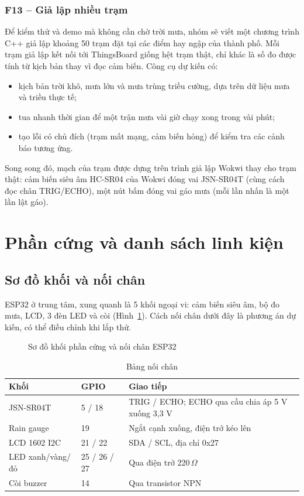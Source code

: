 \documentclass[12pt,a4paper]{article}
\begin{document}
\subsubsection{F13 -- Giả lập nhiều trạm}\label{sec:f13}
Để kiểm thử và demo mà không cần chờ trời mưa, nhóm sẽ viết một chương trình C++ giả lập khoảng 50 trạm đặt tại các điểm hay ngập của thành phố. Mỗi trạm giả lập kết nối tới ThingsBoard giống hệt trạm thật, chỉ khác là số đo được tính từ kịch bản thay vì đọc cảm biến. Công cụ dự kiến có:
\begin{itemize}
  \item kịch bản trời khô, mưa lớn và mưa trùng triều cường, dựa trên dữ liệu mưa và triều thực tế;
  \item tua nhanh thời gian để một trận mưa vài giờ chạy xong trong vài phút;
  \item tạo lỗi có chủ đích (trạm mất mạng, cảm biến hỏng) để kiểm tra các cảnh báo tương ứng.
\end{itemize}
Song song đó, mạch của trạm được dựng trên trình giả lập Wokwi thay cho trạm thật: cảm biến siêu âm HC-SR04 của Wokwi đóng vai JSN-SR04T (cùng cách đọc chân TRIG/ECHO), một nút bấm đóng vai gáo mưa (mỗi lần nhấn là một lần lật gáo).

\section{Phần cứng và danh sách linh kiện}

\subsection{Sơ đồ khối và nối chân}

ESP32 ở trung tâm, xung quanh là 5 khối ngoại vi: cảm biến siêu âm, bộ đo mưa, LCD, 3 đèn LED và còi (Hình~\ref{fig:wiring}). Cách nối chân dưới đây là phương án dự kiến, có thể điều chỉnh khi lắp thử.

\begin{figure}[H]
\centering
\resizebox{\linewidth}{!}{\FigWiring}
\caption{Sơ đồ khối phần cứng và nối chân ESP32}
\label{fig:wiring}
\end{figure}

\begin{table}[H]
\centering
\caption{Bảng nối chân}
\renewcommand{\arraystretch}{1.3}
\begin{tabular}{|L{3.4cm}|C{2.6cm}|L{8cm}|}
\hline
{}\textbf{Khối} & \textbf{GPIO} & \textbf{Giao tiếp} \\ \hline
JSN-SR04T & 5 / 18 & TRIG / ECHO; ECHO qua cầu chia áp 5 V xuống 3,3 V \\ \hline
Rain gauge & 19 & Ngắt cạnh xuống, điện trở kéo lên \\ \hline
LCD 1602 I2C & 21 / 22 & SDA / SCL, địa chỉ 0x27 \\ \hline
LED xanh/vàng/đỏ & 25 / 26 / 27 & Qua điện trở 220\,$\Omega$ \\ \hline
Còi buzzer & 14 & Qua transistor NPN \\ \hline
\end{tabular}
\end{table}
\end{document}
